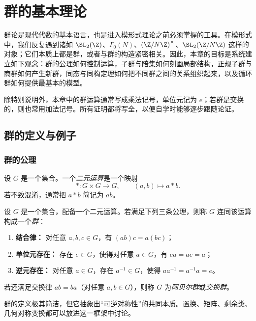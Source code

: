 \chapter{群的基本理论}

群论是现代代数的基本语言，也是进入模形式理论之前必须掌握的工具。在模形式中，我们反复遇到诸如 $\SL_2(\Z)$、$\Gamma_0(N)$、$\left(\Z/N\Z\right)^\times$、$\SL_2(\Z/N\Z)$ 这样的对象；它们本质上都是群，或者与群的构造紧密相关。因此，本章的目标是系统建立如下观念：群的公理如何控制运算，子群与陪集如何刻画局部结构，正规子群与商群如何产生新群，同态与同构定理如何把不同群之间的关系组织起来，以及循环群如何提供最基本的模型。

除特别说明外，本章中的群运算通常写成乘法记号，单位元记为 $e$；若群是交换的，则也常用加法记号。所有证明都将写全，以便自学时能够逐步跟随论证。

\section{群的定义与例子}

\subsection*{群的公理}

\begin{definition}
设 $G$ 是一个集合。一个\emph{二元运算}是一个映射
\[
*: G \times G \longrightarrow G, \qquad (a,b) \longmapsto a*b.
\]
若不致混淆，通常把 $a*b$ 简记为 $ab$。
\end{definition}

\begin{definition}
设 $G$ 是一个集合，配备一个二元运算。若满足下列三条公理，则称 $G$ 连同该运算构成一个\emph{群}：
\begin{enumerate}[label=\textnormal{(G\arabic*)}, leftmargin=3.8em]
  \item \textbf{结合律：} 对任意 $a,b,c \in G$，有 $(ab)c=a(bc)$；
  \item \textbf{单位元存在：} 存在 $e \in G$，使得对任意 $a \in G$，有 $ea=ae=a$；
  \item \textbf{逆元存在：} 对任意 $a \in G$，存在 $a^{-1} \in G$，使得 $aa^{-1}=a^{-1}a=e$。
\end{enumerate}
若还满足交换律 $ab=ba$（对任意 $a,b \in G$），则称 $G$ 为\emph{阿贝尔群}或\emph{交换群}。
\end{definition}

\begin{remark}
群的定义极其简洁，但它抽象出“可逆对称性”的共同本质。置换、矩阵、剩余类、几何对称变换都可以放进这一框架中讨论。
\end{remark}

